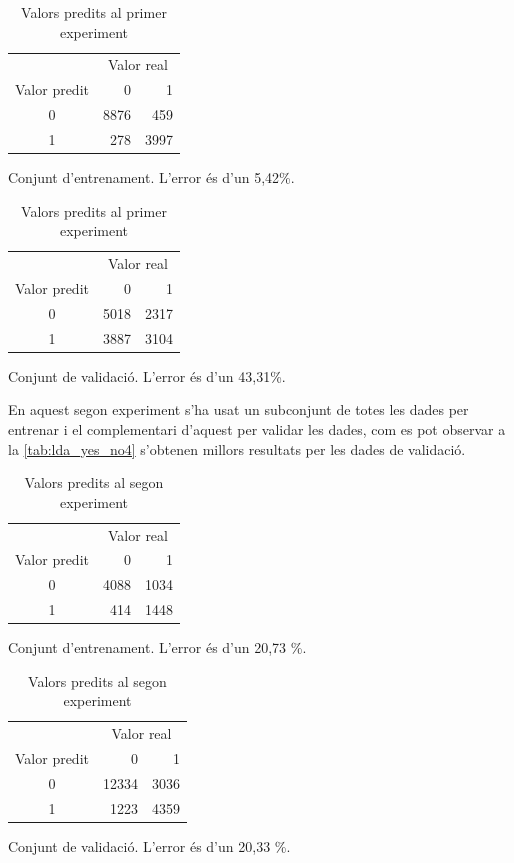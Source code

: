 \documentclass[a4paper]{article}
\begin{document}
\begin{table}[H]
	\def\arraystretch{1.5}
	\begin{subtable}[t]{0.49\textwidth}
		\centering
		\begin{tabular}{|c|rr|}
			\hline
			& \multicolumn{2}{c|}{Valor real} \\
			Valor predit & 0 & 1 \\
			\hline
			0 & 8876 & 459 \\
			1 & 278 & 3997 \\
			\hline
		\end{tabular}
		\caption{Conjunt d'entrenament. L'error és d'un 5,42\%.}
		\label{tab:lda_yes_no1}
	\end{subtable}
	\hfill
	\begin{subtable}[t]{0.49\textwidth}
		\centering
		\begin{tabular}{|c|rr|}
			\hline
			& \multicolumn{2}{c|}{Valor real} \\
			Valor predit & 0 & 1 \\
			\hline
			0 & 5018 & 2317 \\
			1 & 3887 & 3104 \\
			\hline
		\end{tabular}
		\caption{Conjunt de validació. L'error és d'un 43,31\%.}
		\label{tab:lda_yes_no2}
	\end{subtable}
	\caption{Valors predits al primer experiment}
\end{table}

En aquest segon experiment s'ha usat un subconjunt de totes les dades per entrenar i el complementari d'aquest per validar les dades, com es pot observar a la \autoref{tab:lda_yes_no4} s'obtenen millors resultats per les dades de validació.

\begin{table}[H]
	\def\arraystretch{1.5}
	\begin{subtable}[t]{0.49\textwidth}
		\centering
		\begin{tabular}{|c|rr|}
			\hline
			& \multicolumn{2}{c|}{Valor real} \\
			Valor predit & 0 & 1 \\
			\hline
			0 & 4088 & 1034 \\
			1 &  414 & 1448 \\
			\hline
		\end{tabular}
		\caption{Conjunt d'entrenament. L'error és d'un 20,73 \%.}
		\label{tab:lda_yes_no3}
	\end{subtable}
	\hfill
	\begin{subtable}[t]{0.49\textwidth}
		\centering
		\begin{tabular}{|c|rr|}
			\hline
			& \multicolumn{2}{c|}{Valor real} \\
			Valor predit & 0 & 1 \\
			\hline
			0 & 12334 & 3036 \\
			1 &  1223 & 4359 \\
			\hline
		\end{tabular}
		\caption{Conjunt de validació. L'error és d'un 20,33 \%.}
		\label{tab:lda_yes_no4}
	\end{subtable}
	\caption{Valors predits al segon experiment}
\end{table}
\end{document}
